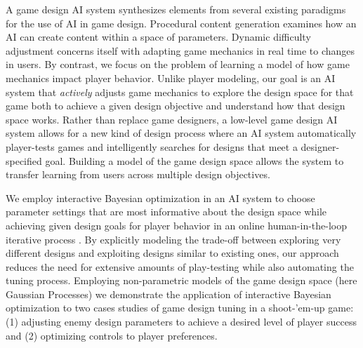 \documentclass[letterpaper]{article}
\begin{document}
A game design AI system synthesizes elements from several existing paradigms for the use of AI in game design. Procedural content generation examines how an AI can create content within a space of parameters.  Dynamic difficulty adjustment concerns itself with adapting game mechanics in real time to changes in users. By contrast, we focus on the problem of learning a model of how game mechanics impact player behavior. Unlike player modeling, our goal is an AI system that {\em actively} adjusts game mechanics to explore the design space for that game both to achieve a given design objective and understand how that design space works. Rather than replace game designers, a low-level game design AI system allows for a new kind of design process where an AI system automatically player-tests games and intelligently searches for designs that meet a designer-specified goal. Building a model of the game design space allows the system to transfer learning from users across multiple design objectives.


We employ interactive Bayesian optimization in an AI system to choose parameter settings that are most informative about the design space while achieving given design goals for player behavior in an online human-in-the-loop iterative process \cite{brochu2010:thesis}. By explicitly modeling the trade-off between exploring very different designs and exploiting designs similar to existing ones, our approach reduces the need for extensive amounts of play-testing while also automating the tuning process.
Employing non-parametric models of the game design space (here Gaussian Processes) we demonstrate the application of interactive Bayesian optimization to two cases studies of game design tuning in a shoot-'em-up game: (1) adjusting enemy design parameters to achieve a desired level of player success and (2) optimizing controls to player preferences.
\end{document}
